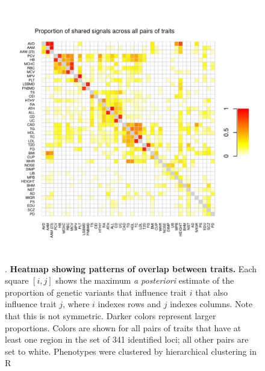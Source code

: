 \documentclass[11pt,titlepage]{article}
\begin{document}
\begin{figure}
\begin{center}
\includegraphics[scale = 0.8]{figs/heatmap.pdf}
\caption{. \textbf{Heatmap showing patterns of overlap between traits.} Each square $[i,j]$ shows the maximum \emph{a posteriori} estimate of the proportion of genetic variants that influence trait $i$ that also influence trait $j$, where $i$ indexes rows and $j$ indexes columns. Note that this is not symmetric. Darker colors represent larger proportions. Colors are shown for all pairs of traits that have at least one region in the set of 341 identified loci; all other pairs are set to white. Phenotypes were clustered by hierarchical clustering in R \citep{R-Core-Team:2013aa}}\label{f_overlap}
\end{center}
\end{figure}
\end{document}
